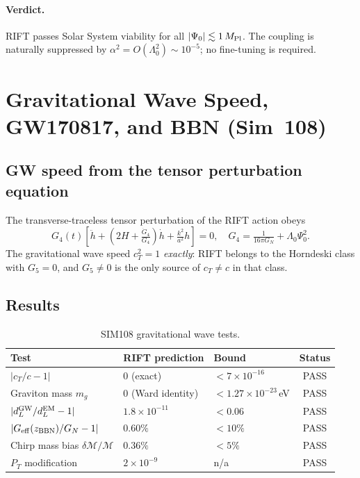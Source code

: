 \documentclass[12pt,a4paper]{article}
\begin{document}
\paragraph{Verdict.}  RIFT passes Solar System viability for all
$|\Psi_0|\lesssim 1\,M_{\rm Pl}$.  The coupling is naturally suppressed by
$\alpha^2=O(\Lambda_0^2)\sim10^{-5}$; no fine-tuning is required.

\section{Gravitational Wave Speed, GW170817, and BBN (Sim~108)}
\label{sec:sim108}

\subsection{GW speed from the tensor perturbation equation}

The transverse-traceless tensor perturbation of the RIFT action obeys
\begin{equation}
  G_4(t)\!\left[\ddot{h} + \!\left(2H + \tfrac{\dot{G}_4}{G_4}\right)\dot{h}
  + \tfrac{k^2}{a^2}h\right] = 0,
  \quad G_4 = \tfrac{1}{16\pi G_N} + \Lambda_0\Psi_0^2.
\end{equation}
The gravitational wave speed $c_T^2 = 1$ \emph{exactly}: RIFT belongs to
the Horndeski class with $G_5=0$, and $G_5\ne0$ is the only source of
$c_T\ne c$ in that class.

\subsection{Results}

\begin{table}[h]
\centering
\caption{SIM108 gravitational wave tests.}
\label{tab:sim108}
\begin{tabular}{lllc}
\hline
Test & RIFT prediction & Bound & Status \\
\hline
$|c_T/c-1|$                        & $0$ (exact)          & $<7\times10^{-16}$ & PASS \\
Graviton mass $m_g$                & $0$ (Ward identity)  & $<1.27\times10^{-23}$\,eV & PASS \\
$|d_L^{\rm GW}/d_L^{\rm EM}-1|$   & $1.8\times10^{-11}$  & $<0.06$ & PASS \\
$|G_{\rm eff}(z_{\rm BBN})/G_N-1|$& $0.60\%$             & $<10\%$ & PASS \\
Chirp mass bias $\delta\mathcal{M}/\mathcal{M}$ & $0.36\%$ & $<5\%$ & PASS \\
$P_T$ modification                 & $2\times10^{-9}$     & n/a & PASS \\
\hline
\end{tabular}
\end{table}
\end{document}
